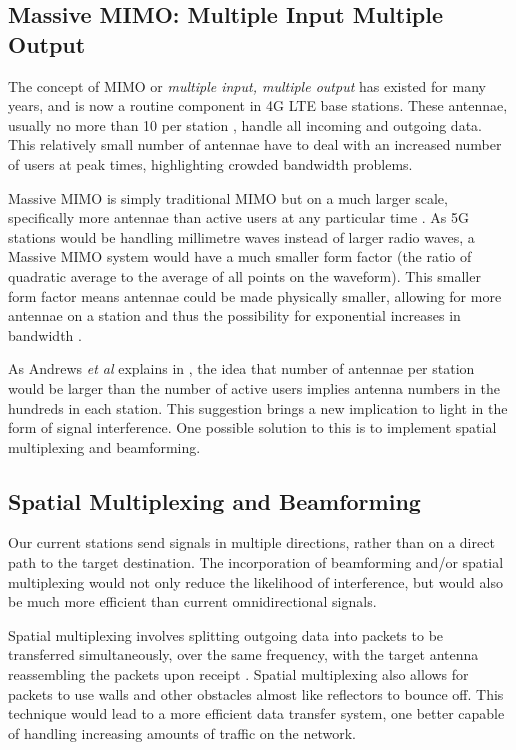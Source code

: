 \documentclass[journal]{IEEEtran}
\begin{document}
\subsection{Massive MIMO: Multiple Input Multiple Output}
The concept of MIMO or \textit{multiple input, multiple output} has existed for many years, and is now a routine component in 4G LTE base stations. These antennae, usually no more than 10 per station \cite{mimo}, handle all incoming and outgoing data. This relatively small number of antennae have to deal with an increased number of users at peak times, highlighting crowded bandwidth problems.

Massive MIMO is simply traditional MIMO but on a much larger scale, specifically more antennae than active users at any particular time \cite{whatwill5gbe}. As 5G stations would be handling millimetre waves instead of larger radio waves, a Massive MIMO system would have a much smaller form factor (the ratio of quadratic average to the average of all points on the waveform). This smaller form factor means antennae could be made physically smaller, allowing for more antennae on a station and thus the possibility for exponential increases in bandwidth \cite{mimo}.

As Andrews \textit{et al} explains in \cite{whatwill5gbe}, the idea that number of antennae per station would be larger than the number of active users implies antenna numbers in the hundreds in each station. This suggestion brings a new implication to light in the form of signal interference. One possible solution to this is to implement spatial multiplexing and beamforming.

\subsection{Spatial Multiplexing and Beamforming}\label{subsec:beamspac}
Our current stations send signals in multiple directions, rather than on a direct path to the target destination. The incorporation of beamforming and/or spatial multiplexing would not only reduce the likelihood of interference, but would also be much more efficient than current omnidirectional signals.

Spatial multiplexing involves splitting outgoing data into packets to be transferred simultaneously, over the same frequency, with the target antenna reassembling the packets upon receipt \cite{beam_sm}. Spatial multiplexing also allows for packets to use walls and other obstacles almost like reflectors to bounce off. This technique would lead to a more efficient data transfer system, one better capable of handling increasing amounts of traffic on the network.
\end{document}
